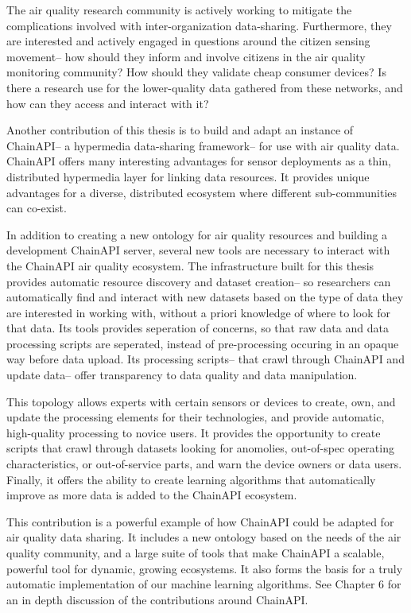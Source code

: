 The air quality research community is actively working to mitigate the complications involved with inter-organization data-sharing.  Furthermore, they are interested and actively engaged in questions around the citizen sensing movement-- how should they inform and involve citizens in the air quality monitoring community?  How should they validate cheap consumer devices?  Is there a research use for the lower-quality data gathered from these networks, and how can they access and interact with it? 

Another contribution of this thesis is to build and adapt an instance of ChainAPI-- a hypermedia data-sharing framework-- for use with air quality data.  ChainAPI offers many interesting advantages for sensor deployments as a thin, distributed hypermedia layer for linking data resources.  It provides unique advantages for a diverse, distributed ecosystem where different sub-communities can co-exist.  

In addition to creating a new ontology for air quality resources and building a development ChainAPI server, several new tools are necessary to interact with the ChainAPI air quality ecosystem.  The infrastructure built for this thesis provides automatic resource discovery and dataset creation-- so researchers can automatically find and interact with new datasets based on the type of data they are interested in working with, without a priori knowledge of where to look for that data.  Its tools provides seperation of concerns, so that raw data and data processing scripts are seperated, instead of pre-processing occuring in an opaque way before data upload.  Its processing scripts-- that crawl through ChainAPI and update data-- offer transparency to data quality and data manipulation.  

This topology allows experts with certain sensors or devices to create, own, and update the processing elements for their technologies, and provide automatic, high-quality processing to novice users.  It provides the opportunity to create scripts that crawl through datasets looking for anomolies, out-of-spec operating characteristics, or out-of-service parts, and warn the device owners or data users.  Finally, it offers the ability to create learning algorithms that automatically improve as more data is added to the ChainAPI ecosystem. 

This contribution is a powerful example of how ChainAPI could be adapted for air quality data sharing.  It includes a new ontology based on the needs of the air quality community, and a large suite of tools that make ChainAPI a scalable, powerful tool for dynamic, growing ecosystems.  It also forms the basis for a truly automatic implementation of our machine learning algorithms.  See Chapter 6 for an in depth discussion of the contributions around ChainAPI.


